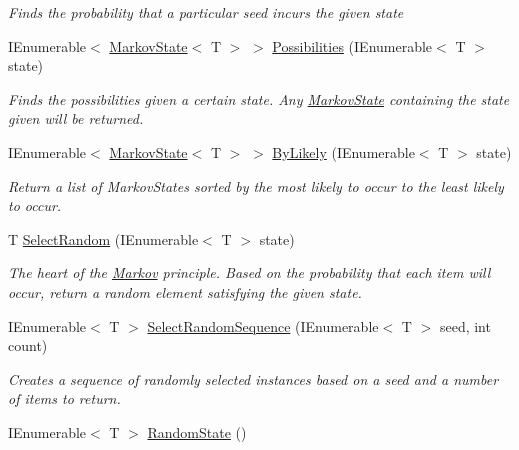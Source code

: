 \begin{DoxyCompactItemize}
\begin{DoxyCompactList}\small\item\em Finds the probability that a particular seed incurs the given state \end{DoxyCompactList}\item 
I\+Enumerable$<$ \hyperlink{classHumDrum_1_1Collections_1_1Markov_1_1MarkovState}{Markov\+State}$<$ T $>$ $>$ \hyperlink{classHumDrum_1_1Collections_1_1Markov_1_1Markov_a335512aba3225f560a44f29f39d41613}{Possibilities} (I\+Enumerable$<$ T $>$ state)
\begin{DoxyCompactList}\small\item\em Finds the possibilities given a certain state. Any \hyperlink{classHumDrum_1_1Collections_1_1Markov_1_1MarkovState}{Markov\+State} containing the state given will be returned. \end{DoxyCompactList}\item 
I\+Enumerable$<$ \hyperlink{classHumDrum_1_1Collections_1_1Markov_1_1MarkovState}{Markov\+State}$<$ T $>$ $>$ \hyperlink{classHumDrum_1_1Collections_1_1Markov_1_1Markov_aab4b626dea779625ecfcd7648f8b8d92}{By\+Likely} (I\+Enumerable$<$ T $>$ state)
\begin{DoxyCompactList}\small\item\em Return a list of Markov\+States sorted by the most likely to occur to the least likely to occur. \end{DoxyCompactList}\item 
T \hyperlink{classHumDrum_1_1Collections_1_1Markov_1_1Markov_a840ff3b5256b93f3a73b6332a237bc41}{Select\+Random} (I\+Enumerable$<$ T $>$ state)
\begin{DoxyCompactList}\small\item\em The heart of the \hyperlink{classHumDrum_1_1Collections_1_1Markov_1_1Markov}{Markov} principle. Based on the probability that each item will occur, return a random element satisfying the given state. \end{DoxyCompactList}\item 
I\+Enumerable$<$ T $>$ \hyperlink{classHumDrum_1_1Collections_1_1Markov_1_1Markov_a20d111872b9aac86b8852c1825aea822}{Select\+Random\+Sequence} (I\+Enumerable$<$ T $>$ seed, int count)
\begin{DoxyCompactList}\small\item\em Creates a sequence of randomly selected instances based on a seed and a number of items to return. \end{DoxyCompactList}\item 
I\+Enumerable$<$ T $>$ \hyperlink{classHumDrum_1_1Collections_1_1Markov_1_1Markov_a4a6b25a6f0aba3a22c8b6e183edbbd0f}{Random\+State} ()

\end{DoxyCompactItemize}
